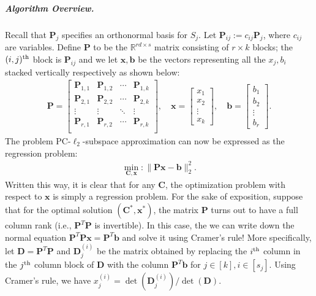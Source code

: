 \documentclass[11pt]{article}
\theoremstyle{plain}
\theoremstyle{plain}
\theoremstyle{definition}
\theoremstyle{plain}
\theoremstyle{remark}
\newcommand{\RR}{\mathbb{R}}
\DeclareRobustCommand{\fairSAp}[1]{PC-$\ell_{#1}$-subspace approximation}
\begin{document}
\subparagraph*{Algorithm Overview.} Recall that $\bm{P}_j$ specifies an orthonormal basis for $S_j$. Let $\bm{P}_{ij}:=c_{ij}\bm{P}_j$, where $c_{ij}$ are variables.  Define $\bm{P}$ to be the $\RR^{rd\times s}$ matrix consisting of $r \times k$ blocks; the $(i,j)^{\textnormal{th}}$ block is $\bm{P}_{ij}$ and we let $\bm{x}, \bm{b}$ be the vectors representing all the $x_j, b_i$ stacked vertically respectively as shown below: 
\begin{align*}
   \bm{P}= \left[\begin{array}{c|c|c|c}
\bm{P}_{1,1}  & \bm{P}_{1,2}  & \cdots & \bm{P}_{1,k}   \\ \hline
\bm{P}_{2,1}  & \bm{P}_{2,2}  & \cdots & \bm{P}_{2,k}   \\ \hline
  \vdots & \vdots & \ddots & \vdots \\ \hline
 \bm{P}_{r,1}  & \bm{P}_{r,2} & \cdots & \bm{P}_{r,k}\\ 
\end{array}\right] , \quad 
\bm{x}=  \left[\begin{array}{c}
x_1   \\ \hline
x_2 \\ \hline
  \vdots  \\ \hline
x_k 
\end{array}\right], \quad 
\bm{b}= \left[\begin{array}{c}
b_1  \\ \hline
b_2 \\ \hline
  \vdots  \\ \hline
b_r  
\end{array}\right].
\end{align*} 
The problem \fairSAp{2} can now be expressed as the regression problem: 
\begin{align}
 \label{eqn:CSS-compact}   \min_{\bm{C,x}} : \|\bm{P}\bm{x}-\bm{b}\|_2^2.
\end{align}
Written this way, it is clear that for any $\bm{C}$, the optimization problem with respect to $\bm{x}$ is simply a regression problem.  For the sake of exposition, suppose that for the optimal solution $(\bm{C}^*, \bm{x}^*)$, the matrix $\bm{P}$ turns out to have a full column rank (i.e., $\bm{P}^T \bm{P}$ is invertible). In this case, the we can write down the normal equation $\bm{P}^T\bm{P}\bm{x}=\bm{P}^T\bm{b}$ and solve it using Cramer's rule! More specifically, let $\bm{D}=\bm{P}^T\bm{P}$ and $\bm{D}_j^{(i)}$ be the matrix obtained by replacing the $i^{\textnormal{th}}$ column in the $j^{\textnormal{th}}$ column block of $\bm{D}$ with the column $\bm{P}^T\bm{b}$ for $j\in [k], i\in [s_j]$. Using Cramer's rule, we have $x_j^{(i)}= \det(\bm{D}_j^{(i)})/\det(\bm{D})$. 
\end{document}
